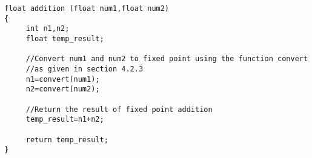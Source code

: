 \lstset{framesep=-10pt, xleftmargin=-10pt}
\begin{lstlisting}[caption={Sample Code for Fixed Addition},label={listing:3}]
float addition (float num1,float num2)
{
     int n1,n2;
     float temp_result;
  
     //Convert num1 and num2 to fixed point using the function convert
     //as given in section 4.2.3
     n1=convert(num1);
     n2=convert(num2);
  
     //Return the result of fixed point addition
     temp_result=n1+n2;
  
     return temp_result;
}
\end{lstlisting}


